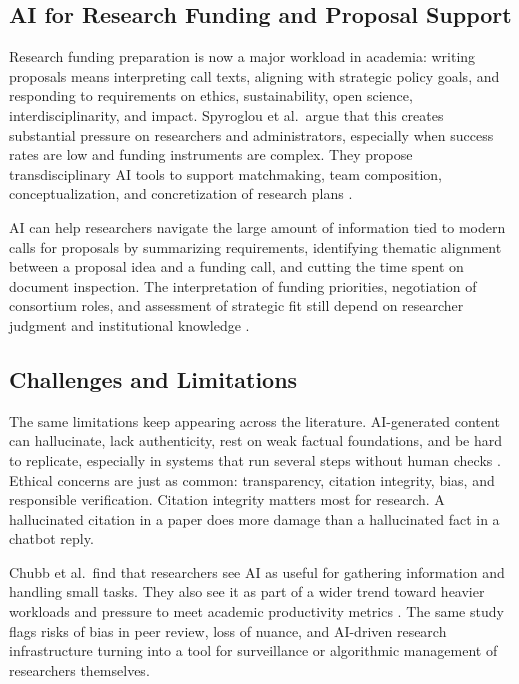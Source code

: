 \documentclass[sn-basic,Numbered]{sn-jnl}
\begin{document}
\subsection{AI for Research Funding and Proposal Support}

Research funding preparation is now a major workload in academia:
writing proposals means interpreting call texts, aligning with
strategic policy goals, and responding to requirements on ethics,
sustainability, open science, interdisciplinarity, and impact.
Spyroglou et al.\ argue that this creates substantial pressure on
researchers and administrators, especially when success rates are low
and funding instruments are complex. They propose transdisciplinary AI
tools to support matchmaking, team composition, conceptualization, and
concretization of research plans \cite{spyroglou2021funding}.

AI can help researchers navigate the large amount of information tied
to modern calls for proposals by summarizing requirements, identifying
thematic alignment between a proposal idea and a funding call, and
cutting the time spent on document inspection. The interpretation of
funding priorities, negotiation of consortium roles, and assessment of
strategic fit still depend on researcher judgment and institutional
knowledge \cite{spyroglou2021funding}.

\subsection{Challenges and Limitations}

The same limitations keep appearing across the literature.
AI-generated content can hallucinate, lack authenticity, rest on weak
factual foundations, and be hard to replicate, especially in systems
that run several steps without human checks
\cite{gridach2025scientific,acharya2025agentic}. Ethical concerns are
just as common: transparency, citation integrity, bias, and responsible
verification. Citation integrity matters most for research. A
hallucinated citation in a paper does more damage than a hallucinated
fact in a chatbot reply.

Chubb et al.\ find that researchers see AI as useful for gathering
information and handling small tasks. They also see it as part of a
wider trend toward heavier workloads and pressure to meet academic
productivity metrics \cite{chubb2022exploring}. The same study flags
risks of bias in peer review, loss of nuance, and AI-driven research
infrastructure turning into a tool for surveillance or algorithmic
management of researchers themselves.
\end{document}
